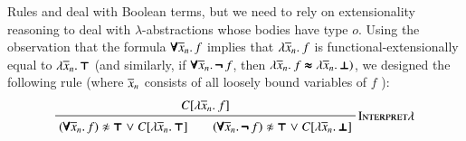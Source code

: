 
Rules  and  deal with Boolean terms,
but we need to rely on extensionality reasoning to deal with $\lambda$-abstractions
whose bodies have type $o$. Using the observation that the formula $\pmb{\forall} \overline{x}_{n}. \, f$ 
implies that $\lambda \overline{x}_{n}.\> f$ is functional-extensionally equal to $\lambda \overline{x}_{n}.\> \pmb{\top}$ (and similarly, if
$\pmb{\forall} \overline{x}_{n}. \, \pmb{\neg\,} f$, then $\lambda \overline{x}_{n}.\> f \pmb{\approx} \lambda \overline{x}_{n}.\> \pmb{\bot})$, we
designed the following rule (where $\overline{x}_{n}$ consists of all loosely bound variables of $f$ ):
%
$$ \namedinference{Interpret$\lambda$}{C[\lam{\tuplen{x}}{f}]}
{(\iforall {\tuplen{x}}.\, f) \noteq \itrue \llor C[\lam{\tuplen{x}}{\itrue}] \qquad
(\iforall {\tuplen{x}}.\, \inot f) \noteq \itrue \llor C[\lam{\tuplen{x}}{\ifalse}]} $$
%

